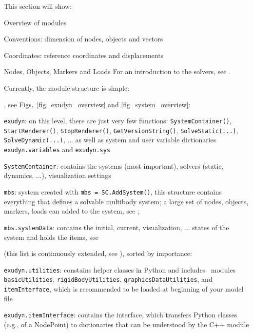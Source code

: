 %
 \label{sec:programStructure}
This section will show:
\bi
  \item Overview of modules
  \item Conventions: dimension of nodes, objects and vectors
  \item Coordinates: reference coordinates and displacements
  \item Nodes, Objects, Markers and Loads
\ei
For an introduction to the solvers, see .

Currently, the module structure is simple:
\bi
  \item {}, see Figs.\ \ref{fig_exudyn_overview} and \ref{fig_system_overview}:
  \bi
    \item[--] \texttt{exudyn}:
    on this level, there are just very few functions: \texttt{SystemContainer()}, \texttt{StartRenderer()}, \texttt{StopRenderer()}, \texttt{GetVersionString()}, \texttt{SolveStatic(...)}, \texttt{SolveDynamic(...)}, ... as well as system and user variable dictionaries \texttt{exudyn.variables} and \texttt{exudyn.sys}
    \item[--] \texttt{SystemContainer}: contains the systems (most important), solvers (static, dynamics, ...), visualization settings
    \item[--] \texttt{mbs}: system created with \texttt{mbs = SC.AddSystem()}, this structure contains everything that defines a solvable multibody system; a large set of nodes, objects, markers, 
    loads can added to the system, see ;
    \item[--] \texttt{mbs.systemData}: contains the initial, current, visualization, ... states of the system and holds the items, see 
  \ei
  \item {} (this list is continuously extended, see ), sorted by importance:
  \bi
    \item[--] \texttt{exudyn.utilities}: constains helper classes in Python and includes \codeName\ modules \texttt{basicUtilities}, \texttt{rigidBodyUtilities}, \texttt{graphicsDataUtilities}, and \texttt{itemInterface}, which is recommended to be loaded at beginning of your model file
    \item[--] \texttt{exudyn.itemInterface}: contains the interface, which transfers Python classes (e.g., of a NodePoint) to dictionaries that can be understood by the C++ module
